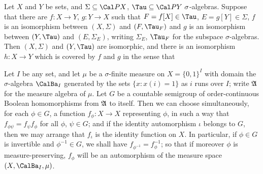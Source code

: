  Let $X$ and $Y$ be sets, and 
$\Sigma\subseteq\Cal PX$, $\Tau\subseteq\Cal PY\,\,\sigma$-algebras.   
Suppose that there are
$f:X\to Y$, $g:Y\to X$ such that $F=f[X]\in\Tau$, $E=g[Y]\in\Sigma$, $f$
is an isomorphism between $(X,\Sigma)$ and $(F,\Tau_F)$ and $g$ is an
isomorphism between $(Y,\Tau)$ and $(E,\Sigma_E)$, writing $\Sigma_E$,
$\Tau_F$ for the subspace $\sigma$-algebras.   Then
$(X,\Sigma)$ and $(Y,\Tau)$ are isomorphic, and there is an isomorphism
$h:X\to Y$ which is covered by $f$ and $g$ in the sense that




 Let $I$ be any set, and let $\mu$ be a
$\sigma$-finite measure on $X=\{0,1\}^I$ with domain the
$\sigma$-algebra $\CalBa_I$ generated by the sets $\{x:x(i)=1\}$ as $i$
runs over $I$;  write $\frak A$ for the measure algebra of $\mu$.
Let $G$ be a countable semigroup of order-continuous Boolean
homomorphisms from $\frak A$ to itself.   Then we can choose
simultaneously, for each $\phi\in G$, a function $f_{\phi}:X\to X$
representing $\phi$, in such a way that $f_{\phi\psi}=f_{\psi}f_{\phi}$
for all $\phi$, $\psi\in G$;  and if the identity automorphism $\iota$
belongs to $G$, then we may arrange that $f_{\iota}$ is the identity
function on $X$.   In particular, if $\phi\in G$ is invertible and
$\phi^{-1}\in G$, we shall have $f_{\phi^{-1}}=f_{\phi}^{-1}$;  so that
if moreover $\phi$ is measure-preserving, $f_{\phi}$ will be an
automorphism of the measure space $(X,\CalBa_I,\mu)$.

